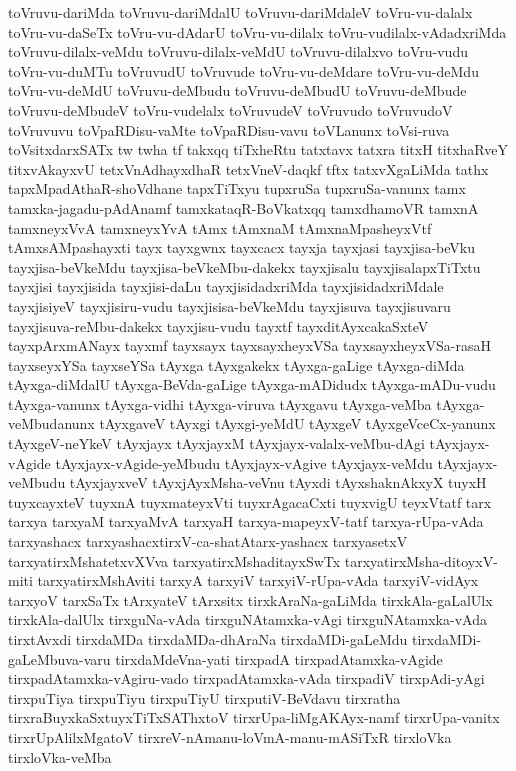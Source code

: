 {toVruvu-dariMda
toVruvu-dariMdalU
toVruvu-dariMdaleV
toVru-vu-dalalx
toVru-vu-daSeTx
toVru-vu-dAdarU
toVru-vu-dilalx
toVru-vudilalx-vAdadxriMda
toVruvu-dilalx-veMdu
toVruvu-dilalx-veMdU
toVruvu-dilalxvo
toVru-vudu
toVru-vu-duMTu
toVruvudU
toVruvude
toVru-vu-deMdare
toVru-vu-deMdu
toVru-vu-deMdU
toVruvu-deMbudu
toVruvu-deMbudU
toVruvu-deMbude
toVruvu-deMbudeV
toVru-vudelalx
toVruvudeV
toVruvudo
toVruvudoV
toVruvuvu
toVpaRDisu-vaMte
toVpaRDisu-vavu
toVLanunx
toVsi-ruva
toVsitxdarxSATx
tw
twha
tf
takxqq
tiTxheRtu
tatxtavx
tatxra
titxH
titxhaRveY
titxvAkayxvU
tetxVnAdhayxdhaR
tetxVneV-daqkf
tftx
tatxvXgaLiMda
tathx
tapxMpadAthaR-shoVdhane
tapxTiTxyu
tupxruSa
tupxruSa-vanunx
tamx
tamxka-jagadu-pAdAnamf
tamxkataqR-BoVkatxqq
tamxdhamoVR
tamxnA
tamxneyxVvA
tamxneyxYvA
tAmx
tAmxnaM
tAmxnaMpasheyxVtf
tAmxsAMpashayxti
tayx
tayxgwnx
tayxcacx
tayxja
tayxjasi
tayxjisa-beVku
tayxjisa-beVkeMdu
tayxjisa-beVkeMbu-dakekx
tayxjisalu
tayxjisalapxTiTxtu
tayxjisi
tayxjisida
tayxjisi-daLu
tayxjisidadxriMda
tayxjisidadxriMdale
tayxjisiyeV
tayxjisiru-vudu
tayxjisisa-beVkeMdu
tayxjisuva
tayxjisuvaru
tayxjisuva-reMbu-dakekx
tayxjisu-vudu
tayxtf
tayxditAyxcakaSxteV
tayxpArxmANayx
tayxmf
tayxsayx
tayxsayxheyxVSa
tayxsayxheyxVSa-rasaH
tayxseyxYSa
tayxseYSa
tAyxga
tAyxgakekx
tAyxga-gaLige
tAyxga-diMda
tAyxga-diMdalU
tAyxga-BeVda-gaLige
tAyxga-mADidudx
tAyxga-mADu-vudu
tAyxga-vanunx
tAyxga-vidhi
tAyxga-viruva
tAyxgavu
tAyxga-veMba
tAyxga-veMbudanunx
tAyxgaveV
tAyxgi
tAyxgi-yeMdU
tAyxgeV
tAyxgeVceCx-yanunx
tAyxgeV-neYkeV
tAyxjayx
tAyxjayxM
tAyxjayx-valalx-veMbu-dAgi
tAyxjayx-vAgide
tAyxjayx-vAgide-yeMbudu
tAyxjayx-vAgive
tAyxjayx-veMdu
tAyxjayx-veMbudu
tAyxjayxveV
tAyxjAyxMsha-veVnu
tAyxdi
tAyxshaknAkxyX
tuyxH
tuyxcayxteV
tuyxnA
tuyxmateyxVti
tuyxrAgacaCxti
tuyxvigU
teyxVtatf
tarx
tarxya
tarxyaM
tarxyaMvA
tarxyaH
tarxya-mapeyxV-tatf
tarxya-rUpa-vAda
tarxyashacx
tarxyashacxtirxV-ca-shatAtarx-yashacx
tarxyasetxV
tarxyatirxMshatetxvXVva
tarxyatirxMshaditayxSwTx
tarxyatirxMsha-ditoyxV-miti
tarxyatirxMshAviti
tarxyA
tarxyiV
tarxyiV-rUpa-vAda
tarxyiV-vidAyx
tarxyoV
tarxSaTx
tArxyateV
tArxsitx
tirxkAraNa-gaLiMda
tirxkAla-gaLalUlx
tirxkAla-dalUlx
tirxguNa-vAda
tirxguNAtamxka-vAgi
tirxguNAtamxka-vAda
tirxtAvxdi
tirxdaMDa
tirxdaMDa-dhAraNa
tirxdaMDi-gaLeMdu
tirxdaMDi-gaLeMbuva-varu
tirxdaMdeVna-yati
tirxpadA
tirxpadAtamxka-vAgide
tirxpadAtamxka-vAgiru-vado
tirxpadAtamxka-vAda
tirxpadiV
tirxpAdi-yAgi
tirxpuTiya
tirxpuTiyu
tirxpuTiyU
tirxputiV-BeVdavu
tirxratha
tirxraBuyxkaSxtuyxTiTxSAThxtoV
tirxrUpa-liMgAKAyx-namf
tirxrUpa-vanitx
tirxrUpAlilxMgatoV
tirxreV-nAmanu-loVmA-manu-mASiTxR
tirxloVka
tirxloVka-veMba
}
